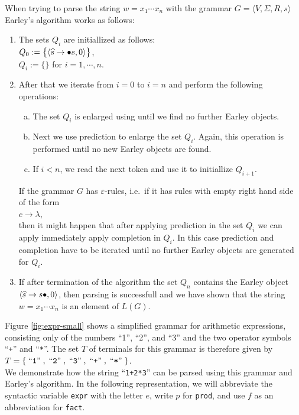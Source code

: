When trying to parse the string $w = x_1 \cdots x_n$ with the grammar
$G = \langle V, \Sigma, R, s \rangle$ Earley's algorithm works as follows:
\begin{enumerate}
\item The sets  $Q_i$ are initiallized as follows:
      \\[0.2cm]
      \hspace*{1.3cm}
      $Q_0 := \bigl\{ \pair(\widehat{s} \rightarrow \bullet s, 0) \bigr\}$,
      \\[0.2cm]
      \hspace*{1.3cm}
      $Q_i := \bigl\{ \bigr\}$ \quad for $i=1,\cdots,n$.
\item After that we iterate from $i=0$ to $i=n$ and perform the following operations:
      \begin{enumerate}[(a)]
      \item The set $Q_i$ is enlarged using  until we find no further
            Earley objects.
      \item Next we use prediction to enlarge the set $Q_i$.
            Again, this operation is performed until no new Earley objects are found.
      \item If $i < n$, we read the next token and use it to initiallize $Q_{i+1}$.
      \end{enumerate}
      If the grammar $G$ has  $\varepsilon$-rules, i.e.~if it has rules with empty right hand side of the form
      \\[0.2cm]
      \hspace*{1.3cm}
      $c \rightarrow \lambda$,
      \\[0.2cm]
      then it might happen that after applying prediction in the set $Q_i$ we can apply immediately apply
      completion in $Q_i$.  In this case prediction and completion have to be iterated until no further Earley
      objects are generated for $Q_i$.
\item If after termination of the algorithm the set  $Q_n$ contains the Earley object
      $\pair(\widehat{s} \rightarrow s \bullet,0)$, then parsing is successfull and we have shown that
      the string $w = x_1 \cdots x_n$ is an element of $L(G)$.
\end{enumerate}
  
\exampleEng
Figure \ref{fig:expr-small} shows a simplified grammar for arithmetic expressions, consisting only of the
numbers “1”, “2”, and “3” and the two operator symbols “\texttt{+}” and “\texttt{*}”. The set $T$ of terminals
for this grammar is therefore given by
\\[0.2cm]
\hspace*{1.3cm}
 $T = \{ \;\mbox{``\texttt{1}''}\;, \;\mbox{``\texttt{2}''}\;, \;\mbox{``\texttt{3}''}\;, \;\mbox{``\texttt{+}''}\;, \;\mbox{``\texttt{*}''}\; \}$.
\\[0.2cm]
We demonstrate how the string “\texttt{1+2*3}” can be parsed using this grammar and Earley’s algorithm. In the
following representation, we will abbreviate the syntactic variable \texttt{expr} with the letter $e$, write 
$p$ for \texttt{prod}, and use $f$ as an abbreviation for \texttt{fact}. 


